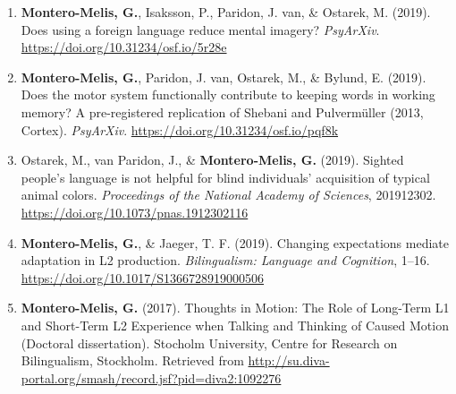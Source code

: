 \documentclass[margin, 11pt]{res} %
\begin{document}
\begin{resume}


\begin{enumerate}

	\item \textbf{Montero-Melis, G.}, Isaksson, P., Paridon, J. van, \& Ostarek, M. (2019). Does using a foreign language reduce mental imagery? \emph{PsyArXiv}. \url{https://doi.org/10.31234/osf.io/5r28e}

	\item \textbf{Montero-Melis, G.}, Paridon, J. van, Ostarek, M., \& Bylund, E. (2019). Does the motor system functionally contribute to keeping words in working memory? A pre-registered replication of Shebani and Pulvermüller (2013, Cortex). \emph{PsyArXiv}. \url{https://doi.org/10.31234/osf.io/pqf8k}


	\item Ostarek, M., van Paridon, J., \& \textbf{Montero-Melis, G.} (2019). Sighted people’s language is not helpful for blind individuals’ acquisition of typical animal colors. \emph{Proceedings of the National Academy of Sciences}, 201912302. \url{https://doi.org/10.1073/pnas.1912302116}

	\item \textbf{Montero-Melis, G.}, \& Jaeger, T. F. (2019). Changing expectations mediate adaptation in L2 production. \emph{Bilingualism: Language and Cognition}, 1–16. \url{https://doi.org/10.1017/S1366728919000506}


	
	\item \textbf{Montero-Melis, G.} (2017). Thoughts in Motion: The Role of Long-Term L1 and Short-Term L2 Experience when Talking and Thinking of Caused Motion (Doctoral dissertation). Stocholm University, Centre for Research on Bilingualism, Stockholm. Retrieved from \url{http://su.diva-portal.org/smash/record.jsf?pid=diva2:1092276}


\end{enumerate}
\end{resume}
\end{document}
